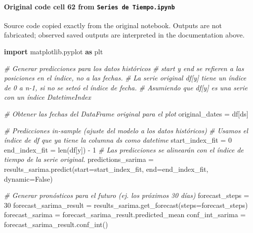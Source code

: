\documentclass[
  11pt,
]{article}
\newenvironment{Shaded}{}{}
\newcommand{\BuiltInTok}[1]{\textcolor[rgb]{0.00,0.50,0.00}{#1}}
\newcommand{\CommentTok}[1]{\textcolor[rgb]{0.38,0.63,0.69}{\textit{#1}}}
\newcommand{\DecValTok}[1]{\textcolor[rgb]{0.25,0.63,0.44}{#1}}
\newcommand{\ImportTok}[1]{\textcolor[rgb]{0.00,0.50,0.00}{\textbf{#1}}}
\newcommand{\NormalTok}[1]{#1}
\newcommand{\OperatorTok}[1]{\textcolor[rgb]{0.40,0.40,0.40}{#1}}
\newcommand{\StringTok}[1]{\textcolor[rgb]{0.25,0.44,0.63}{#1}}
\newcommand{\VariableTok}[1]{\textcolor[rgb]{0.10,0.09,0.49}{#1}}
\begin{document}
\paragraph{\texorpdfstring{Original code cell 62 from \texttt{Series\ de\ Tiempo.ipynb}}{Original code cell 62 from Series de Tiempo.ipynb}}\label{original-code-cell-62-from-series-de-tiempoipynb}

Source code copied exactly from the original notebook. Outputs are not fabricated; observed saved outputs are interpreted in the documentation above.

\begin{Shaded}
\begin{Highlighting}[]
\ImportTok{import}\NormalTok{ matplotlib.pyplot }\ImportTok{as}\NormalTok{ plt}

\CommentTok{\# Generar predicciones para los datos históricos}
\CommentTok{\# start y end se refieren a las posiciones en el índice, no a las fechas.}
\CommentTok{\# La serie original df[\textquotesingle{}y\textquotesingle{}] tiene un índice de 0 a n{-}1, si no se seteó el índice de fecha.}
\CommentTok{\# Asumiendo que df[\textquotesingle{}y\textquotesingle{}] es una serie con un índice DatetimeIndex}

\CommentTok{\# Obtener las fechas del DataFrame original para el plot}
\NormalTok{original\_dates }\OperatorTok{=}\NormalTok{ df[}\StringTok{\textquotesingle{}ds\textquotesingle{}}\NormalTok{]}

\CommentTok{\# Predicciones in{-}sample (ajuste del modelo a los datos históricos)}
\CommentTok{\# Usamos el índice de \textasciigrave{}df\textasciigrave{} que ya tiene la columna \textquotesingle{}ds\textquotesingle{} como datetime}
\NormalTok{start\_index\_fit }\OperatorTok{=} \DecValTok{0}
\NormalTok{end\_index\_fit }\OperatorTok{=} \BuiltInTok{len}\NormalTok{(df[}\StringTok{\textquotesingle{}y\textquotesingle{}}\NormalTok{]) }\OperatorTok{{-}} \DecValTok{1}
\CommentTok{\# Las predicciones se alinearán con el índice de tiempo de la serie original.}
\NormalTok{predictions\_sarima }\OperatorTok{=}\NormalTok{ results\_sarima.predict(start}\OperatorTok{=}\NormalTok{start\_index\_fit, end}\OperatorTok{=}\NormalTok{end\_index\_fit, dynamic}\OperatorTok{=}\VariableTok{False}\NormalTok{)}

\CommentTok{\# Generar pronósticos para el futuro (ej. los próximos 30 días)}
\NormalTok{forecast\_steps }\OperatorTok{=} \DecValTok{30}
\NormalTok{forecast\_sarima\_result }\OperatorTok{=}\NormalTok{ results\_sarima.get\_forecast(steps}\OperatorTok{=}\NormalTok{forecast\_steps)}
\NormalTok{forecast\_sarima }\OperatorTok{=}\NormalTok{ forecast\_sarima\_result.predicted\_mean}
\NormalTok{conf\_int\_sarima }\OperatorTok{=}\NormalTok{ forecast\_sarima\_result.conf\_int()}


\end{Highlighting}
\end{Shaded}
\end{document}
